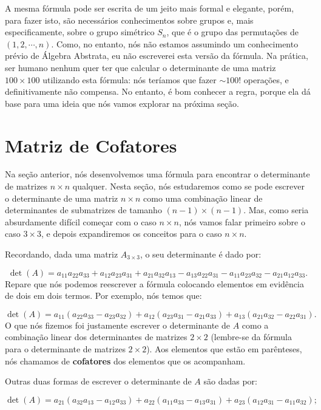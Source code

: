 A mesma fórmula pode ser escrita de um jeito mais formal e elegante, porém, para fazer isto, são necessários conhecimentos sobre grupos e, mais especificamente, sobre o grupo simétrico $S_n$, que é o grupo das permutações de $(1, 2, \cdots, n)$. Como, no entanto, nós não estamos assumindo um conhecimento prévio de Álgebra Abstrata, eu não escreverei esta versão da fórmula. Na prática, ser humano nenhum quer ter que calcular o determinante de uma matriz $100\times 100$ utilizando esta fórmula: nós teríamos que fazer $\sim 100!$ operações, e definitivamente não compensa. No entanto, é bom conhecer a regra, porque ela dá base para uma ideia que nós vamos explorar na próxima seção.

\section{Matriz de Cofatores}

Na seção anterior, nós desenvolvemos uma fórmula para encontrar o determinante de matrizes $n\times n$ qualquer. Nesta seção, nós estudaremos como se pode escrever o determinante de uma matriz $n\times n$ como uma combinação linear de determinantes de submatrizes de tamanho $(n - 1)\times (n - 1)$. Mas, como seria absurdamente difícil começar com o caso $n\times n$, nós vamos falar primeiro sobre o caso $3\times 3$, e depois expandiremos os conceitos para o caso $n\times n$.

Recordando, dada uma matriz $A_{3\times 3}$, o seu determinante é dado por:

$$
\det(A) = a_{11}a_{22}a_{33} + a_{12}a_{23}a_{31} + a_{21}a_{32}a_{13}- a_{13}a_{22}a_{31} - a_{11}a_{23}a_{32} - a_{21}a_{12}a_{33}.
$$
Repare que nós podemos reescrever a fórmula colocando elementos em evidência de dois em dois termos. Por exemplo, nós temos que:

$$
\det(A) = a_{11}(a_{22}a_{33} - a_{23}a_{32}) + a_{12}(a_{23}a_{31} - a_{21}a_{33}) + a_{13}(a_{21}a_{32} - a_{22}a_{31}).
$$
O que nós fizemos foi justamente escrever o determinante de $A$ como a combinação linear dos determinantes de matrizes $2\times 2$ (lembre-se da fórmula para o determinante de matrizes $2\times 2$). Aos elementos que estão em parênteses, nós chamamos de \textbf{cofatores} dos elementos que os acompanham.

Outras duas formas de escrever o determinante de $A$ são dadas por:

$$
\det(A) = a_{21}(a_{32}a_{13} - a_{12}a_{33}) + a_{22}(a_{11}a_{33} - a_{13}a_{31}) + a_{23}(a_{12}a_{31} - a_{11}a_{32});
$$

